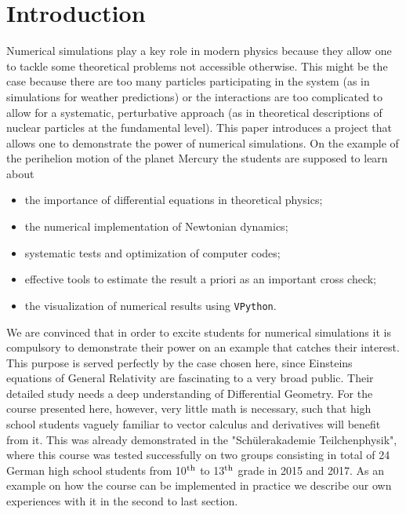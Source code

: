 \documentclass[12pt,ngerman,american]{iopart}
\newcommand{\vpython}[0]{\texttt{VPython}}
\begin{document}
\section{Introduction}\label{sec:intro}

Numerical simulations play a key role in modern physics because they allow one to tackle some theoretical problems not accessible otherwise. This might be the case because there are too many particles participating in the system (as in simulations for weather predictions) or the interactions are too complicated to allow for a systematic, perturbative approach (as in theoretical descriptions of nuclear particles at the fundamental level).
This paper introduces a project that allows one to demonstrate the power of numerical simulations.
On the example of the perihelion motion of the planet Mercury the students are supposed to learn about
\begin{itemize}
\item the importance of differential equations in theoretical physics;
\item the numerical implementation of Newtonian dynamics;
\item systematic tests and optimization of computer codes;
\item effective tools to estimate the result a priori as an important cross check;
\item the visualization of numerical results using \vpython{}.
\end{itemize}
We are convinced that in order to excite students for numerical simulations it is compulsory to demonstrate their power on an example that catches their interest.
This purpose is served perfectly by the case chosen here, since Einsteins equations of General Relativity are fascinating to a very broad public.
Their detailed study needs a deep understanding of Differential Geometry. For the course presented here, however, very little math is necessary, such that high school students vaguely familiar to vector calculus and derivatives will benefit from it.
This was already demonstrated in the "Sch\"ulerakademie Teilchenphysik", where this course was tested successfully on two groups consisting in total of 24 German high school students from 10$^{\rm th}$ to 13$^{\rm th}$ grade in 2015 and 2017. As an example on how the course can be implemented in practice we describe our own
experiences with it in the second to last section. 
\end{document}
